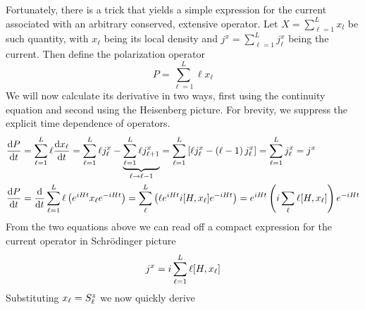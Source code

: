 Fortunately, there is a trick that yields a simple expression for the current
associated with an arbitrary conserved, extensive operator. Let \(X = \sum^{L}_{\ell=1}x_l\) be such quantity,
with \(x_{\ell}\) being its local density and \(j^x = \sum^{L}_{\ell=1} j^x_{\ell}\) being the current.
Then define the polarization operator
\begin{equation}
    P = \sum^{L}_{\ell=1}\ell x_{\ell}
\end{equation}
We will now calculate its derivative in two ways, first using the continuity equation and second using
the Heisenberg picture. For brevity, we suppress the explicit time dependence of operators.
\begin{align}
    \dv{P}{t} & = \sum^{L}_{\ell=1} \ell \dv{x_{\ell}}{t} =
    \sum^{L}_{\ell=1} \ell j^x_{\ell} - \underbrace{\sum_{\ell=1}^{L} \ell j^x_{\ell+1}}_{\ell \to \ell - 1}
    = \sum_{\ell=1}^{L} \left[\ell j^x_{\ell} - \left(\ell-1\right)j^{x}_{\ell}\right]
    = \sum_{\ell=1}^L j^x_{\ell} = j^x                                                    \\
    \dv{P}{t} & = \dv{t} \sum_{\ell=1}^L \ell \left(e^{i H t}x_{\ell} e^{-i H t}\right) =
    \sum_{\ell}^{L} \left(\ell e^{i H t} i \comm{H}{x_{\ell}}e^{-i H t}\right) =
    e^{i H t} \left(i \sum_{\ell} \ell \comm{H}{x_{\ell}}\right)e^{-i H t}
\end{align}
From the two equations above we can read off a compact expression for the current operator in Schr{\"o}dinger
picture
\begin{equation}
    j^x = i \sum_{\ell=1}^L \ell\comm{H}{x_{\ell}}
    \label{eq:polarization}
\end{equation}
Substituting \(x_{\ell} = S^{z}_{\ell}\) we now quickly derive
